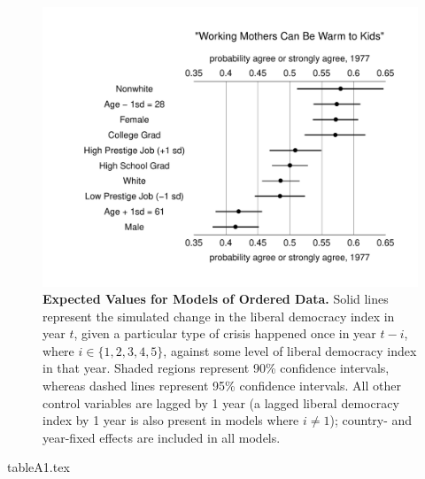 \documentclass[12pt]{article}
\theoremstyle{hypotheses}
\begin{document}
\begin{figure}[tbh]
  \begin{center}
      \includegraphics[width=1.05\textwidth]{plots/mothers1catEV.pdf}
      \vspace{-2.5em}
      \caption{\textbf{Expected Values for Models of Ordered Data.} Solid lines represent the simulated change in the liberal democracy index in year $t$, given a particular type of crisis happened once in year $t-i$, where $i \in \{1, 2, 3, 4, 5\}$, against some level of liberal democracy index in that year. Shaded regions represent 90\% confidence intervals, whereas dashed lines represent 95\% confidence intervals. All other control variables are lagged by 1 year (a lagged liberal democracy index by 1 year is also present in models where $i \neq 1$); country- and year-fixed effects are included in all models.}
      \label{fig:crises*libdem*time}
  \end{center}
\end{figure} 


\begin{landscape}
{tableA1.tex}
\end{landscape}
\end{document}
